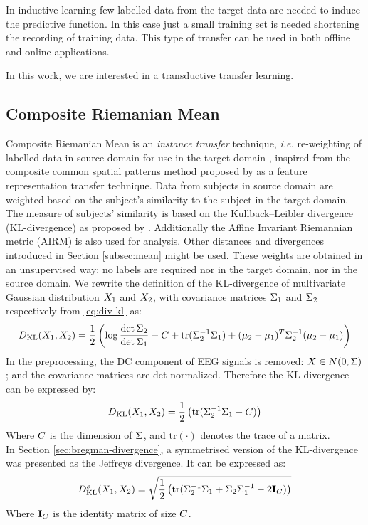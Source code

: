 In inductive learning few labelled data from the target data are needed to induce the predictive function. 
In this case just a small training set is needed shortening the recording of training data. 
This type of transfer can be used in both offline and online applications.  

%

In this work, we are interested in a transductive  transfer learning. 

\subsection{Composite Riemanian Mean}
\label{subsec:composite-riem-mean}

Composite Riemanian Mean is an \emph{instance transfer} technique, \textit{i.e.} re-weighting of labelled data in source domain for use in the target domain \citep{pan_survey_2010}, inspired from the composite common spatial patterns method proposed by \citep{kang_composite_2009} as a feature representation transfer technique.
Data from subjects in source domain are weighted based on the subject's similarity to the subject in the target domain. 
The measure of subjects' similarity is based on the Kullback–Leibler divergence (KL-divergence) as proposed by \citep{kang_composite_2009}. 
Additionally the Affine Invariant Riemannian metric (AIRM) is also used for analysis. Other distances and divergences introduced in Section \ref{subsec:mean} might be used. 
These weights are obtained in an unsupervised way; no labels are required nor in the target domain, nor in the source domain.
We rewrite the definition of the KL-divergence of multivariate Gaussian distribution $\X_1$ and $\X_2$, with covariance matrices $\P_1$ and $\P_2$ respectively from \eqref{eq:div-kl} as:
\[
\divB{KL}(\X_1,\X_2) = \frac{1}{2} \left( \log \frac{\det \P_2}{\det \P_1} - \dc + \text{tr}(\P_2^{-1} \P_1) + (\mu_2-\mu_1)^T \P_2^{-1}(\mu_2-\mu_1) \right)
\]
In the preprocessing, the DC component of EEG signals is removed: $\X \in N(0,\P)$; and the covariance matrices are det-normalized.
Therefore the KL-divergence can be expressed by:
\[
\divB{KL}(\X_1,\X_2) = \frac{1}{2} \left( \text{tr}(\P_2^{-1} \P_1 - \dc)  \right)
\]
Where $\dc$ is the dimension of $\P$, and $\text{tr}(\cdot)$ denotes the trace of a matrix.\\
In Section \ref{sec:bregman-divergence}, a symmetrised version of the KL-divergence was presented as the Jeffreys divergence. It can be expressed as:
\begin{equation}
\divB{KL}^s(\X_1,\X_2) = \sqrt{  \frac{1}{2} \left( \text{tr}(\P_2^{-1} \P_1 + \P_2 \P_1^{-1} - 2 \eye_{\dc})  \right)  } 
\label{eq:KLDs}
\end{equation}
Where $\eye_{\dc}$ is the identity matrix of size $\dc$.
 
